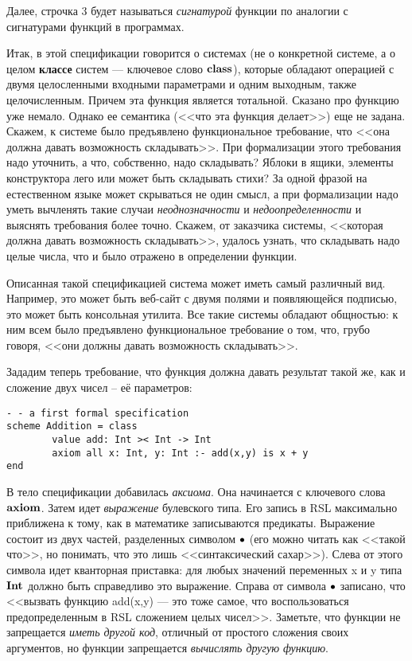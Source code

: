 \documentclass[14pt]{extreport}
\begin{document}
Далее, строчка 3 будет называться \emph{сигнатурой} функции по аналогии с сигнатурами функций в программах.

Итак, в этой спецификации говорится о системах (не о конкретной системе, а о целом \textbf{классе} систем --- ключевое слово $\mathop{\textbf{class}}$), которые обладают операцией с двумя целосленными входными параметрами и одним выходным, также целочисленным. Причем эта функция является тотальной. Сказано про функцию уже немало. Однако ее семантика (<<что эта функция делает>>) еще не задана. Скажем, к системе было предъявлено функциональное требование, что <<она должна давать возможность складывать>>. При формализации этого требования надо уточнить, а что, собственно, надо складывать? Яблоки в ящики, элементы конструктора лего или может быть складывать стихи? За одной фразой на естественном языке может скрываться не один смысл, а при формализации надо уметь вычленять такие случаи \emph{неоднозначности} и \emph{недоопределенности} и выяснять требования более точно. Скажем, от заказчика системы, <<которая должна давать возможность складывать>>, удалось узнать, что складывать надо целые числа, что и было отражено в определении функции.

Описанная такой спецификацией система может иметь самый различный вид. Например, это может быть веб-сайт с двумя полями и появляющейся подписью, это может быть консольная утилита. Все такие системы обладают общностью: к ним всем было предъявлено функциональное требование о том, что, грубо говоря, <<они должны давать возможность складывать>>.

Зададим теперь требование, что функция должна давать результат такой же, как и сложение двух чисел -- её параметров:

\begin{lstlisting}
- - a first formal specification
scheme Addition = class
        value add: Int >< Int -> Int
        axiom all x: Int, y: Int :- add(x,y) is x + y
end
\end{lstlisting}

В тело спецификации добавилась \emph{аксиома}. Она начинается с ключевого слова $\mathop{\textbf{axiom}}$. Затем идет \emph{выражение} булевского типа. Его запись в RSL максимально приближена к тому, как в математике записываются предикаты. Выражение состоит из двух частей, разделенных символом $\mathop{\bullet}$ (его можно читать как <<такой что>>, но понимать, что это лишь <<синтаксический сахар>>). Слева от этого символа идет кванторная приставка: для любых значений переменных x и y типа $\textbf{Int}$ должно быть справедливо это выражение. Справа от символа $\mathop{\bullet}$ записано, что <<вызвать функцию add(x,y) --- это тоже самое, что воспользоваться предопределенным в RSL сложением целых чисел>>. Заметьте, что функции не запрещается \emph{иметь другой код}, отличный от простого сложения своих аргументов, но функции запрещается \emph{вычислять другую функцию}.
\end{document}
